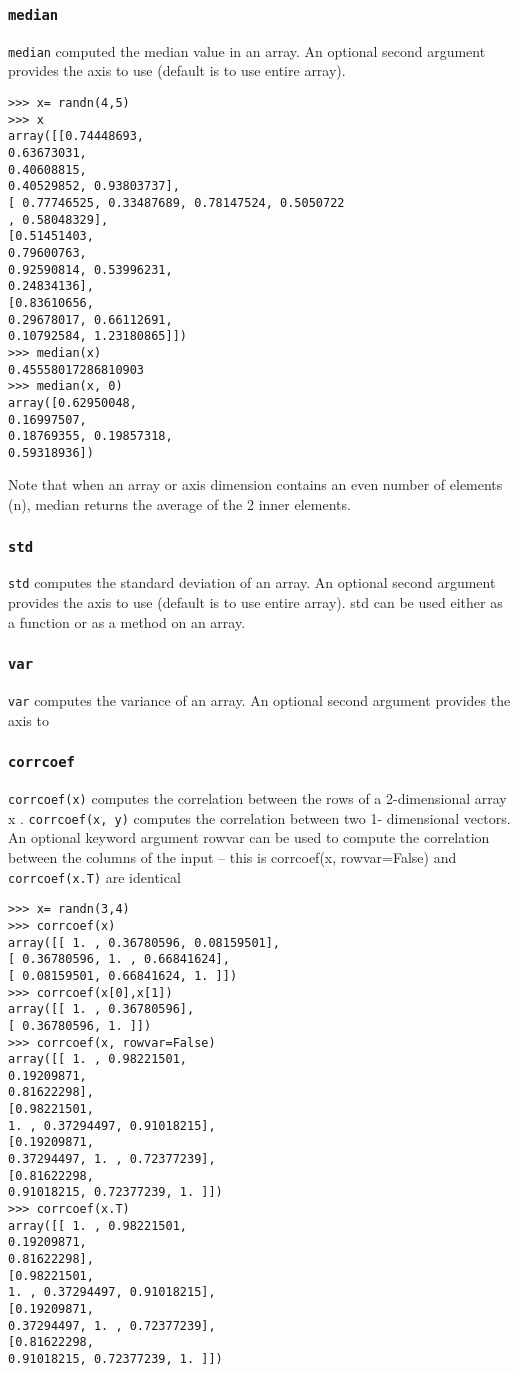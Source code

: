 \documentclass[KSmain.tex]{subfiles}
\begin{document}
\subsubsection*{\texttt{median}}
\texttt{median} computed the median value in an array. An optional second argument provides the axis to use
(default is to use entire array).
\begin{framed}
\begin{verbatim}
>>> x= randn(4,5)
>>> x
array([[0.74448693,
0.63673031,
0.40608815,
0.40529852, 0.93803737],
[ 0.77746525, 0.33487689, 0.78147524, 0.5050722
, 0.58048329],
[0.51451403,
0.79600763,
0.92590814, 0.53996231,
0.24834136],
[0.83610656,
0.29678017, 0.66112691,
0.10792584, 1.23180865]])
>>> median(x)
0.45558017286810903
>>> median(x, 0)
array([0.62950048,
0.16997507,
0.18769355, 0.19857318,
0.59318936])
\end{verbatim}
\end{framed}
Note that when an array or axis dimension contains an even number of elements (n), median returns the
average of the 2 inner elements.
\subsubsection*{\texttt{std}}
\texttt{std} computes the standard deviation of an array. An optional second argument provides the axis to use
(default is to use entire array). std can be used either as a function or as a method on an array.
\subsubsection*{\texttt{var}}
\texttt{var} computes the variance of an array. An optional second argument provides the axis to


\subsubsection*{\texttt{corrcoef}}
\texttt{corrcoef(x)} computes the correlation between the rows of a 2-dimensional array x . \texttt{corrcoef(x, y)} computes
the correlation between two 1- dimensional vectors. An optional keyword argument rowvar can be
used to compute the correlation between the columns of the input – this is corrcoef(x, rowvar=False)
and \texttt{corrcoef(x.T)} are identical

\begin{framed}
\begin{verbatim}
>>> x= randn(3,4)
>>> corrcoef(x)
array([[ 1. , 0.36780596, 0.08159501],
[ 0.36780596, 1. , 0.66841624],
[ 0.08159501, 0.66841624, 1. ]])
>>> corrcoef(x[0],x[1])
array([[ 1. , 0.36780596],
[ 0.36780596, 1. ]])
>>> corrcoef(x, rowvar=False)
array([[ 1. , 0.98221501,
0.19209871,
0.81622298],
[0.98221501,
1. , 0.37294497, 0.91018215],
[0.19209871,
0.37294497, 1. , 0.72377239],
[0.81622298,
0.91018215, 0.72377239, 1. ]])
>>> corrcoef(x.T)
array([[ 1. , 0.98221501,
0.19209871,
0.81622298],
[0.98221501,
1. , 0.37294497, 0.91018215],
[0.19209871,
0.37294497, 1. , 0.72377239],
[0.81622298,
0.91018215, 0.72377239, 1. ]])
\end{verbatim}
\end{framed}
\end{document}
